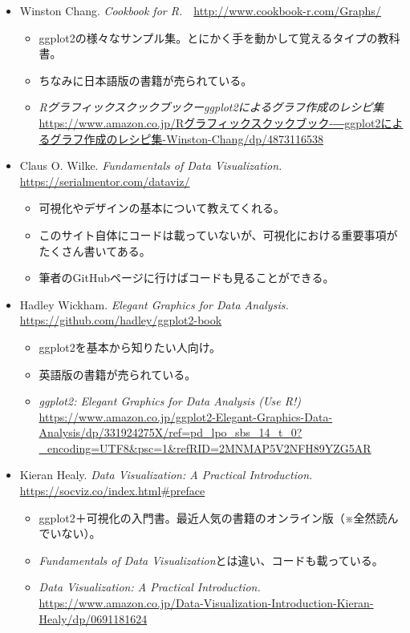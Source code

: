 \documentclass[]{book}
\begin{document}
\begin{itemize}
\item
  Winston Chang. \emph{Cookbook for
  R.}　\url{http://www.cookbook-r.com/Graphs/}

  \begin{itemize}
  \item
    ggplot2の様々なサンプル集。とにかく手を動かして覚えるタイプの教科書。
  \item
    ちなみに日本語版の書籍が売られている。
  \item
    \emph{Rグラフィックスクックブックーggplot2によるグラフ作成のレシピ集}　\url{https://www.amazon.co.jp/Rグラフィックスクックブック-―ggplot2によるグラフ作成のレシピ集-Winston-Chang/dp/4873116538}
  \end{itemize}
\item
  Claus O. Wilke. \emph{Fundamentals of Data
  Visualization.}　\url{https://serialmentor.com/dataviz/}

  \begin{itemize}
  \item
    可視化やデザインの基本について教えてくれる。
  \item
    このサイト自体にコードは載っていないが、可視化における重要事項がたくさん書いてある。
  \item
    筆者のGitHubページに行けばコードも見ることができる。
  \end{itemize}
\item
  Hadley Wickham. \emph{Elegant Graphics for Data
  Analysis.}　\url{https://github.com/hadley/ggplot2-book}

  \begin{itemize}
  \item
    ggplot2を基本から知りたい人向け。
  \item
    英語版の書籍が売られている。
  \item
    \emph{ggplot2: Elegant Graphics for Data Analysis (Use
    R!)}　\url{https://www.amazon.co.jp/ggplot2-Elegant-Graphics-Data-Analysis/dp/331924275X/ref=pd_lpo_sbs_14_t_0?_encoding=UTF8\&psc=1\&refRID=2MNMAP5V2NFH89YZG5AR}
  \end{itemize}
\item
  Kieran Healy. \emph{Data Visualization: A Practical Introduction.}
  \url{https://socviz.co/index.html\#preface}

  \begin{itemize}
  \item
    ggplot2＋可視化の入門書。最近人気の書籍のオンライン版（※全然読んでいない）。
  \item
    \emph{Fundamentals of Data
    Visualization}とは違い、コードも載っている。
  \item
    \emph{Data Visualization: A Practical Introduction.}
    \url{https://www.amazon.co.jp/Data-Visualization-Introduction-Kieran-Healy/dp/0691181624}
  \end{itemize}
\end{itemize}
\end{document}
